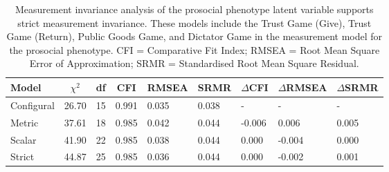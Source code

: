 \documentclass[
  man,floatsintext]{apa6}
\begin{document}
\begin{table}[H]

\begin{center}
\begin{threeparttable}

\caption{\label{tab:tableCompareMIReduced}Measurement invariance analysis of the
prosocial phenotype latent variable supports strict measurement invariance.
These models include the Trust Game (Give), Trust Game (Return), Public Goods
Game, and Dictator Game in the measurement model for the prosocial phenotype.
CFI = Comparative Fit Index; RMSEA = Root Mean Square Error of Approximation;
SRMR = Standardised Root Mean Square Residual.}

\begin{tabular}{lllllllll}
\toprule
Model & \multicolumn{1}{c}{$\chi^2$} & \multicolumn{1}{c}{df} & \multicolumn{1}{c}{CFI} & \multicolumn{1}{c}{RMSEA} & \multicolumn{1}{c}{SRMR} & \multicolumn{1}{c}{$\Delta$CFI} & \multicolumn{1}{c}{$\Delta$RMSEA} & \multicolumn{1}{c}{$\Delta$SRMR}\\
\midrule
Configural & 26.70 & 15 & 0.991 & 0.035 & 0.038 & - & - & -\\
Metric & 37.61 & 18 & 0.985 & 0.042 & 0.044 & -0.006 & 0.006 & 0.005\\
Scalar & 41.90 & 22 & 0.985 & 0.038 & 0.044 & 0.000 & -0.004 & 0.000\\
Strict & 44.87 & 25 & 0.985 & 0.036 & 0.044 & 0.000 & -0.002 & 0.001\\
\bottomrule
\end{tabular}

\end{threeparttable}
\end{center}

\end{table}

\newpage
\end{document}
